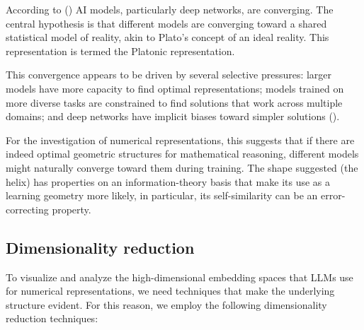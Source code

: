 \documentclass[
  a4paper, twoside, 10pt, titlepage]{book}
\begin{document}
According to () AI models,
particularly deep networks, are converging. The central hypothesis is
that different models are converging toward a shared statistical model
of reality, akin to Plato's concept of an ideal reality. This
representation is termed the Platonic representation.

This convergence appears to be driven by several selective pressures:
larger models have more capacity to find optimal representations; models
trained on more diverse tasks are constrained to find solutions that
work across multiple domains; and deep networks have implicit biases
toward simpler solutions ().

For the investigation of numerical representations, this suggests that
if there are indeed optimal geometric structures for mathematical
reasoning, different models might naturally converge toward them during
training. The shape suggested (the helix) has properties on an
information-theory basis that make its use as a learning geometry more
likely, in particular, its self-similarity can be an error-correcting
property.

\subsection{Dimensionality reduction}\label{dimensionality-reduction}

To visualize and analyze the high-dimensional embedding spaces that LLMs
use for numerical representations, we need techniques that make the
underlying structure evident. For this reason, we employ the following
dimensionality reduction techniques:
\end{document}
